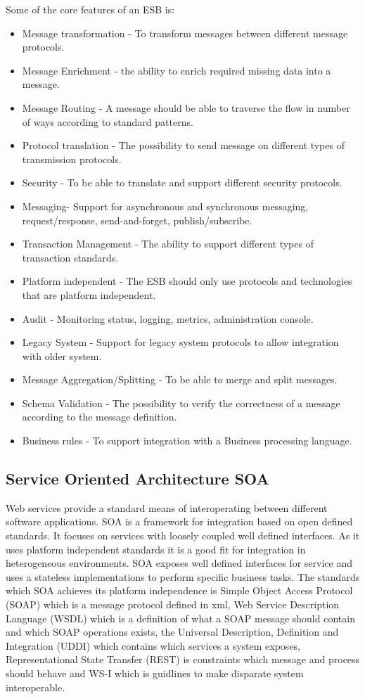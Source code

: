 \documentclass{llncs}
\begin{document}
Some of the core features of an ESB is:
\begin{itemize}
\item Message transformation - To transform messages between different message protocols.
\item Message Enrichment - the ability to enrich required missing data into a message.
\item Message Routing - A message should be able to traverse the flow in number of ways according to standard patterns.
\item Protocol translation - The possibility to send message on different types of transmission protocols.
\item Security - To be able to translate and support different security protocols.
\item Messaging- Support for asynchronous and synchronous messaging, request/response, send-and-forget, publish/subscribe.
\item Transaction Management - The ability to support different types of transaction standards.
\item Platform independent - The ESB should only use protocols and technologies that are platform independent.
\item Audit - Monitoring status, logging, metrics, administration console.
\item Legacy System - Support for legacy system protocols to allow integration with older system.
\item Message Aggregation/Splitting - To be able to merge and split messages.
\item Schema Validation - The possibility to verify the correctness of a message according to the message definition.
\item Business rules - To support integration with a Business processing language.
\end{itemize}



\subsection{Service Oriented Architecture SOA}
Web services provide a standard means of interoperating between different software applications\cite{w3csoa}. SOA is a framework for integration based on open defined standards. It focuses on services with  loosely coupled well defined interfaces. As it uses platform independent standards it is a good fit for integration in heterogeneous environments. SOA exposes well defined interfaces for service and uses a stateless implementations to perform specific business tasks. The standards which SOA achieves its platform independence is Simple Object Access Protocol (SOAP) which is a message protocol defined in xml, Web Service Description Language (WSDL) which is a definition of what a SOAP message should contain and which SOAP operations exists, the Universal Description, Definition and Integration (UDDI) which contains which services a system exposes, Representational State Transfer (REST) is constraints which message and process should behave and WS-I which is guidlines to make disparate system interoperable.
\end{document}
